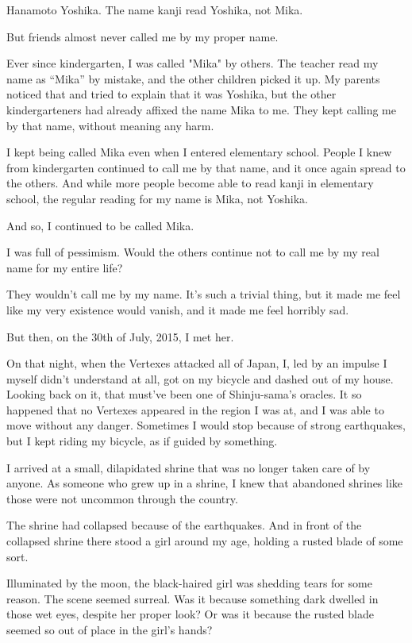 

Hanamoto Yoshika. The name kanji read Yoshika, not Mika.

But friends almost never called me by my proper name.

Ever since kindergarten, I was called "Mika" by others. The teacher read my name as ``Mika'' by mistake, and the other children picked it up. My parents noticed that and tried to explain that it was Yoshika, but the other kindergarteners had already affixed the name Mika to me. They kept calling me by that name, without meaning any harm.

I kept being called Mika even when I entered elementary school. People I knew from kindergarten continued to call me by that name, and it once again spread to the others. And while more people become able to read kanji in elementary school, the regular reading for my name is Mika, not Yoshika.

And so, I continued to be called Mika.

I was full of pessimism. Would the others continue not to call me by my real name for my entire life?

They wouldn't call me by my name. It's such a trivial thing, but it made me feel like my very existence would vanish, and it made me feel horribly sad.

But then, on the 30th of July, 2015, I met her.

On that night, when the Vertexes attacked all of Japan, I, led by an impulse I myself didn't understand at all, got on my bicycle and dashed out of my house. Looking back on it, that must've been one of Shinju-sama's oracles. It so happened that no Vertexes appeared in the region I was at, and I was able to move without any danger. Sometimes I would stop because of strong earthquakes, but I kept riding my bicycle, as if guided by something.

I arrived at a small, dilapidated shrine that was no longer taken care of by anyone. As someone who grew up in a shrine, I knew that abandoned shrines like those were not uncommon through the country.

The shrine had collapsed because of the earthquakes. And in front of the collapsed shrine there stood a girl around my age, holding a rusted blade of some sort.

Illuminated by the moon, the black-haired girl was shedding tears for some reason. The scene seemed surreal. Was it because something dark dwelled in those wet eyes, despite her proper look? Or was it because the rusted blade seemed so out of place in the girl's hands?

